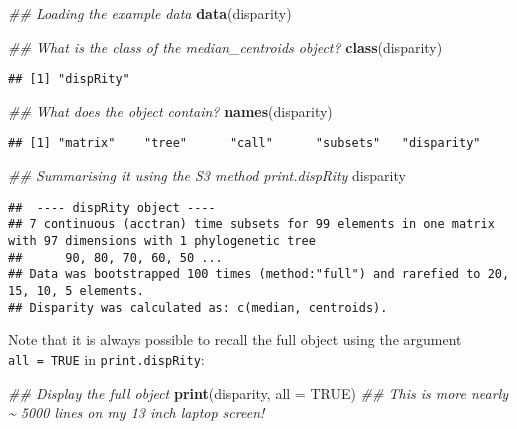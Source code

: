 \documentclass[
]{book}
\newenvironment{Shaded}{\begin{snugshade}}{\end{snugshade}}
\newcommand{\CommentTok}[1]{\textcolor[rgb]{0.56,0.35,0.01}{\textit{#1}}}
\newcommand{\DataTypeTok}[1]{\textcolor[rgb]{0.13,0.29,0.53}{#1}}
\newcommand{\KeywordTok}[1]{\textcolor[rgb]{0.13,0.29,0.53}{\textbf{#1}}}
\newcommand{\NormalTok}[1]{#1}
\newcommand{\OtherTok}[1]{\textcolor[rgb]{0.56,0.35,0.01}{#1}}
\begin{document}
\begin{Shaded}
\begin{Highlighting}[]
\CommentTok{\#\# Loading the example data}
\KeywordTok{data}\NormalTok{(disparity)}

\CommentTok{\#\# What is the class of the median\_centroids object?}
\KeywordTok{class}\NormalTok{(disparity)}
\end{Highlighting}
\end{Shaded}

\begin{verbatim}
## [1] "dispRity"
\end{verbatim}

\begin{Shaded}
\begin{Highlighting}[]
\CommentTok{\#\# What does the object contain?}
\KeywordTok{names}\NormalTok{(disparity)}
\end{Highlighting}
\end{Shaded}

\begin{verbatim}
## [1] "matrix"    "tree"      "call"      "subsets"   "disparity"
\end{verbatim}

\begin{Shaded}
\begin{Highlighting}[]
\CommentTok{\#\# Summarising it using the S3 method print.dispRity}
\NormalTok{disparity}
\end{Highlighting}
\end{Shaded}

\begin{verbatim}
##  ---- dispRity object ---- 
## 7 continuous (acctran) time subsets for 99 elements in one matrix with 97 dimensions with 1 phylogenetic tree
##      90, 80, 70, 60, 50 ...
## Data was bootstrapped 100 times (method:"full") and rarefied to 20, 15, 10, 5 elements.
## Disparity was calculated as: c(median, centroids).
\end{verbatim}

Note that it is always possible to recall the full object using the argument \texttt{all\ =\ TRUE} in \texttt{print.dispRity}:

\begin{Shaded}
\begin{Highlighting}[]
\CommentTok{\#\# Display the full object}
\KeywordTok{print}\NormalTok{(disparity, }\DataTypeTok{all =} \OtherTok{TRUE}\NormalTok{)}
\CommentTok{\#\# This is more nearly \textasciitilde{} 5000 lines on my 13 inch laptop screen!}
\end{Highlighting}
\end{Shaded}
\end{document}
